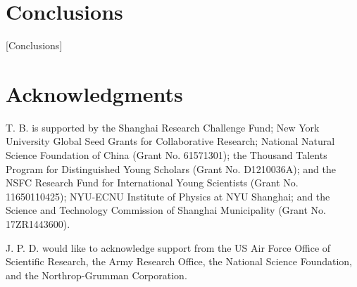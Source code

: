 \documentclass[aps,rmp,reprint,amsmath,amssymb,graphicx,longbibliography]{revtex4-1}
\begin{document}
\section{Conclusions}
\label{conclusions}


[Conclusions]






\section{Acknowledgments}
T. B. is supported by the Shanghai Research Challenge Fund; New York University Global Seed Grants for Collaborative Research; National Natural Science Foundation of China (Grant No. 61571301); the Thousand Talents Program for Distinguished Young Scholars (Grant No. D1210036A); and the NSFC Research Fund for International Young Scientists (Grant No. 11650110425); NYU-ECNU Institute of Physics at NYU Shanghai; and the Science and Technology Commission of Shanghai Municipality (Grant No. 17ZR1443600). 

J. P. D. would like to acknowledge support from the US Air Force Office of Scientific Research, the Army Research Office, the National Science Foundation, and the Northrop-Grumman Corporation.  




\end{document}
